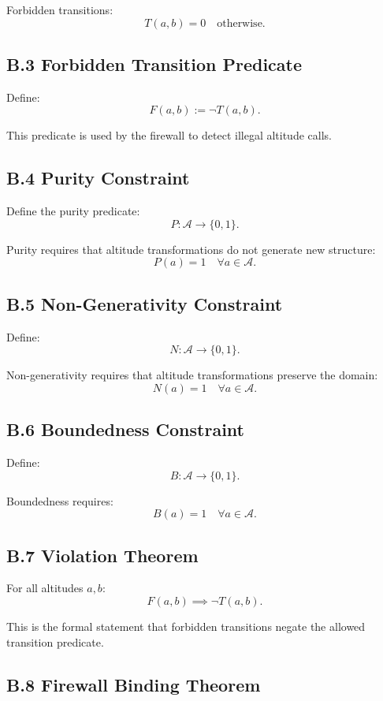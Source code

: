 Forbidden transitions:
\[
T(a,b)=0 \quad \text{otherwise}.
\]

\subsection*{B.3 Forbidden Transition Predicate}

Define:
\[
F(a,b) := \neg T(a,b).
\]

This predicate is used by the firewall to detect illegal altitude calls.

\subsection*{B.4 Purity Constraint}

Define the purity predicate:
\[
P : \mathcal{A} \to \{0,1\}.
\]

Purity requires that altitude transformations do not generate new structure:
\[
P(a) = 1 \quad \forall a \in \mathcal{A}.
\]

\subsection*{B.5 Non-Generativity Constraint}

Define:
\[
N : \mathcal{A} \to \{0,1\}.
\]

Non-generativity requires that altitude transformations preserve the domain:
\[
N(a) = 1 \quad \forall a \in \mathcal{A}.
\]

\subsection*{B.6 Boundedness Constraint}

Define:
\[
B : \mathcal{A} \to \{0,1\}.
\]

Boundedness requires:
\[
B(a) = 1 \quad \forall a \in \mathcal{A}.
\]

\subsection*{B.7 Violation Theorem}

For all altitudes $a,b$:
\[
F(a,b) \implies \neg T(a,b).
\]

This is the formal statement that forbidden transitions negate the allowed transition predicate.

\subsection*{B.8 Firewall Binding Theorem}

